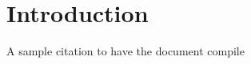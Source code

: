 \section{Introduction}
A sample citation to have the document compile~\cite{2022-Tehrany-NVMe_ZNS} 


